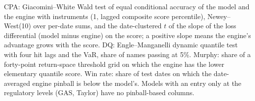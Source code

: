 \documentclass[11pt]{article}
\begin{document}
\begin{table}[htbp]
\begin{threeparttable}
\begin{tabular}{lcccccccc}
\end{tabular}
\begin{tablenotes}\footnotesize
\item CPA: Giacomini--White Wald test of equal conditional accuracy of the model and the engine with instruments (1, lagged composite score percentile), Newey--West(10) over per-date sums, and the date-clustered $t$ of the slope of the loss differential (model minus engine) on the score; a positive slope means the engine's advantage grows with the score. DQ: Engle--Manganelli dynamic quantile test with four hit lags and the VaR, share of names passing at 5\%. Murphy: share of a forty-point return-space threshold grid on which the engine has the lower elementary quantile score. Win rate: share of test dates on which the date-averaged engine pinball is below the model's. Models with an entry only at the regulatory levels (GAS, Taylor) have no pinball-based columns.
\end{tablenotes}
\end{threeparttable}
\end{table}
\end{document}
